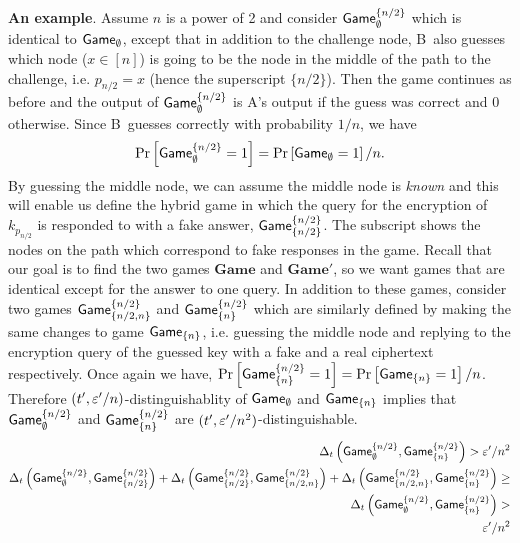 \documentclass{article}
\def\B{{\sf B}}
\def\A{{\sf A}}
\newcommand{\game}{{\sf Game}}
\newcommand{\dgame}{{\mathbf{Game}}}
\newcommand{\dgg}[2]{\game_{#1}^{#2}}
\newcommand{\dgb}[2]{\game_{\cub{#1}}^{\cub{#2}}}
\begin{document}
\noindent \textbf{An example}. Assume $n$ is a power of 2 and consider $\game^{\{n/2\}}_{\emptyset}$ which is identical to $\game_{\emptyset}$, except that in addition to the challenge node, \B~also guesses which node ($x\in [n]$) is going to be the node in the middle of the path to the challenge, i.e. $p_{n/2}=x$ (hence the superscript $\{n/2\}$). Then the game continues as before and the output of $\dgg{\emptyset}{\{n/2\}}$ is \A's output if the guess was correct and 0 otherwise. Since \B~guesses correctly with probability $1/n$, we have 
\[\prob{\dgg{\emptyset}{\cub{n/2}}=1}= \prob{\game_{\emptyset}=1}/n.\]
\noindent By guessing the middle node, we can assume the middle node is \textit{known} and this will enable us define the hybrid game in which the query for the encryption of $k_{p_{n/2}}$ is responded to with a fake answer, $\dgb{n/2}{n/2}$. The subscript shows the nodes on the path which correspond to fake responses in the game. Recall that our goal is to find the two games $\dgame$ and $\dgame'$, so we want games that are identical except for the answer to one query. In addition to these games, consider two games $\dgb{n/2,n}{n/2}$ and $\dgb{n}{n/2}$ which are similarly defined by making the same changes to game $\game_{\{n\}}$, i.e. guessing the middle node and replying to the encryption query  of the guessed key with a fake and a real ciphertext respectively. Once again we have, $\prob{\dgb{n}{n/2}=1}= \prob{\game_{\{n\}}=1}/n$. Therefore $(t',\varepsilon'/n)$-distinguishablity of $\game_{\emptyset}$ and $\game_{\{n\}}$ implies that $\dgg{\emptyset}{\cub{n/2}}$ and $\dgb{n}{n/2}$ are $(t',\varepsilon'/n^2)$-distinguishable.
\begin{align}
\dElta{\dgg{\emptyset}{\cub{n/2}},\dgb{n}{n/2}} > \eps'/n^2 \\
\dElta{\dgg{\emptyset}{\cub{n/2}}, \dgb{n/2}{n/2}} + \dElta{ \dgb{n/2}{n/2},\dgb{n/2,n}{n/2}} + \dElta{ \dgb{n/2,n}{n/2}, \dgb{n}{n/2}} \geq \nonumber \\ \dElta{\dgg{\emptyset}{\cub{n/2}},\dgb{n}{n/2}} > \nonumber \\ \eps'/n^2 \label{3.2} 
\end{align}
\end{document}

